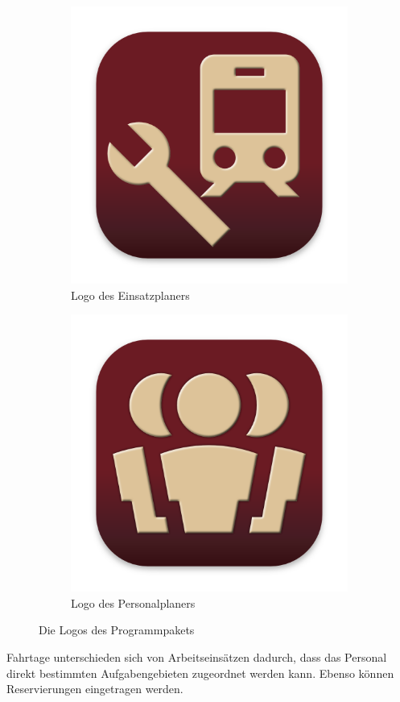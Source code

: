 \begin{figure}[h!]
  \begin{subfigure}{0.3\textwidth}
    \includegraphics[width=\textwidth]{../../Icon/Einsatzplaner.png}
    \caption{Logo des Einsatzplaners}
  \end{subfigure}
  \begin{subfigure}{0.3\textwidth}
    \includegraphics[width=\textwidth]{../../Icon/Personalplaner.png}
    \caption{Logo des Personalplaners}
  \end{subfigure}
  \caption{Die Logos des Programmpakets}
\end{figure}
%
Fahrtage unterschieden sich von Arbeitseinsätzen dadurch, dass das Personal direkt bestimmten Aufgabengebieten zugeordnet werden kann.
Ebenso können Reservierungen eingetragen werden.

